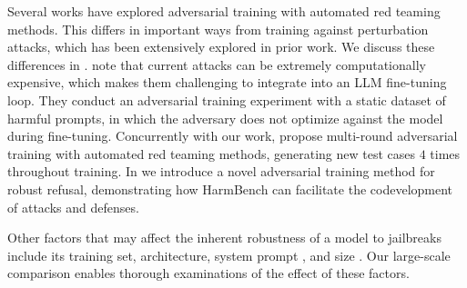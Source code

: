 Several works have explored adversarial training with automated red teaming methods. This differs in important ways from training against perturbation attacks, which has been extensively explored in prior work. We discuss these differences in . \citet{jain2023baseline} note that current attacks can be extremely computationally expensive, which makes them challenging to integrate into an LLM fine-tuning loop. They conduct an adversarial training experiment with a static dataset of harmful prompts, in which the adversary does not optimize against the model during fine-tuning. Concurrently with our work, \citet{ge2023mart} propose multi-round adversarial training with automated red teaming methods, generating new test cases $4$ times throughout training. In  we introduce a novel adversarial training method for robust refusal, demonstrating how HarmBench can facilitate the codevelopment of attacks and defenses.

Other factors that may affect the inherent robustness of a model to jailbreaks include its training set, architecture, system prompt \citep{touvron2023llama, jiang2023mistral}, and size \citep{ganguli2022red}. Our large-scale comparison enables thorough examinations of the effect of these factors.










